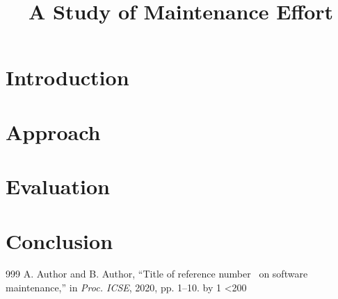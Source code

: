 \documentclass[conference,letterpaper]{IEEEtran}
\begin{document}
\title{A Study of Maintenance Effort}
\author{}
\maketitle
\begin{abstract}
\lipsum[1]
\end{abstract}
\section{Introduction}
\lipsum[2-20]
\section{Approach}
\lipsum[21-50]
\section{Evaluation}
\lipsum[51-80]
\section{Conclusion}
\lipsum[81-98]
\begin{thebibliography}{999}
\newcount\n {}
\loop {} A. Author and B. Author, ``Title of reference number \the\n\ on software maintenance,'' in \emph{Proc. ICSE}, 2020, pp. 1--10.
\advance\n by 1 \ifnum\n<200 \repeat
\end{thebibliography}
\end{document}
